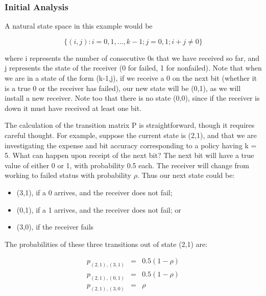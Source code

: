 \subsubsection{Initial Analysis}

A natural state space in this example would be

\begin{equation}
\{(i,j):i=0,1,...,k-1;j=0,1;i+j\neq 0\}
\end{equation}

where i represents the number of consecutive 0s that we have received so
far, and j represents the state of the receiver (0 for failed, 1 for
nonfailed).  Note that when we are in a state of the form (k-1,j), if we
receive a 0 on the next bit (whether it is a true 0 or the receiver has
failed), our new state will be (0,1), as we will install a new receiver.
Note too that there is no state (0,0), since if the receiver is down it
must have received at least one bit.

The calculation of the transition matrix P is straightforward, though it
requires careful thought.  For example, suppose the current state is
(2,1), and that we are investigating the expense and bit accuracy
corresponding to a policy having k = 5. What can happen upon receipt of
the next bit? The next bit will have a true value of either 0 or 1, with
probability 0.5 each. The receiver will change from working to failed
status with probability $\rho$. Thus our next state could be:

\begin{itemize}

\item (3,1), if a 0 arrives, and the receiver does not fail; 

\item (0,1), if a 1 arrives, and the receiver does not fail; or 

\item (3,0), if the receiver fails 

\end{itemize}

The probabilities of these three transitions out of state (2,1) are:

\begin{eqnarray}
p_{(2,1),(3,1)} & = & 0.5(1-\rho ) \\
p_{(2,1),(0,1)} & = & 0.5(1-\rho ) \\  
p_{(2,1),(3,0)} & = & \rho 
\end{eqnarray}  

